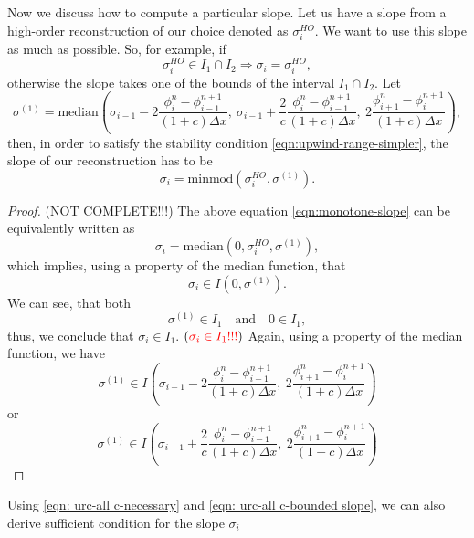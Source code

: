 \documentclass[../thesis.tex]{subfiles}
\begin{document}
Now we discuss how to compute a particular slope. Let us have a slope from a high-order reconstruction of our choice denoted as \(\sigma_{i}^{HO}\). We want to use this slope as much as possible. So, for example, if
\begin{equation}
    \sigma_{i}^{HO} \in I_{1} \cap I_{2}
    \Rightarrow
    \sigma_{i} = \sigma_{i}^{HO},
\end{equation}
otherwise the slope takes one of the bounds of the interval \(I_{1} \cap I_{2}\).
Let
\begin{equation}
    \sigma^{(1)}
    = \mbox{median}\left(
        \sigma_{i-1}
        -2\frac{\phi_{i}^{n} - \phi_{i-1}^{n+1}}
        {(1+c)\Delta x},
        ~\sigma_{i-1}
        +\frac{2}{c}
        \frac{\phi_{i}^{n} - \phi_{i-1}^{n+1}}
        {(1+c)\Delta x},
        ~2\frac{\phi_{i+1}^{n} - \phi_{i}^{n+1}}{(1+c)\Delta x}
    \right),
\end{equation}
then, in order to satisfy the stability condition \eqref{eqn:upwind-range-simpler}, the slope of our reconstruction has to be
\begin{equation}
    \label{eqn:monotone-slope}
    \sigma_{i} = \mbox{minmod}\left(
        \sigma_{i}^{HO},\sigma^{(1)}
    \right).
\end{equation}
\begin{proof}
    (NOT COMPLETE!!!)
    The above equation \eqref{eqn:monotone-slope} can be equivalently written as
    \[
        \sigma_{i} = \mbox{median}\left(
            0,\sigma_{i}^{HO},\sigma^{(1)}
        \right),
    \]
    which implies, using a property of the median function, that
    \[\sigma_{i} \in I(0,\sigma^{(1)}).\]
    We can see, that both
    \[
        \sigma^{(1)} \in I_{1} \quad \text{and}\quad
        0 \in I_{1},
    \]
    thus, we conclude that \(\sigma_{i} \in I_{1}\).
    \((\textcolor{red}{\sigma_{i} \in I_{1}!!!})\)
    Again, using a property of the median function,
    we have
    \[
        \sigma^{(1)}
        \in
        I\left(
        \sigma_{i-1}
        -2\frac{\phi_{i}^{n} - \phi_{i-1}^{n+1}}
        {(1+c)\Delta x},
        ~2\frac{\phi_{i+1}^{n} - \phi_{i}^{n+1}}{(1+c)\Delta x}
        \right)
    \]
    or
    \[
        \sigma^{(1)}
        \in
        I\left(
        \sigma_{i-1}
        +\frac{2}{c}
        \frac{\phi_{i}^{n} - \phi_{i-1}^{n+1}}
        {(1+c)\Delta x},
        ~2\frac{\phi_{i+1}^{n} - \phi_{i}^{n+1}}{(1+c)\Delta x}
        \right)
    \]
\end{proof}
Using \eqref{eqn: urc-all c-necessary} and \eqref{eqn: urc-all c-bounded slope}, we can also derive sufficient condition for the slope \(\sigma_{i}\)
\end{document}
